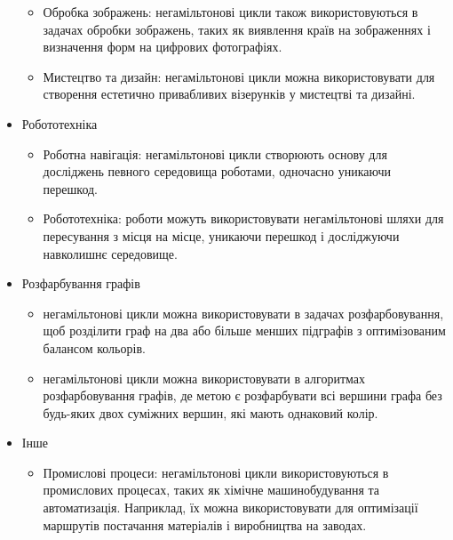 \documentclass[14pt]{article}
\begin{document}
\begin{spacing}{1.175}
\begin{itemize}
\begin{itemize}
            \item Обробка зображень: негамільтонові цикли також використовуються в задачах обробки зображень, таких як виявлення країв на зображеннях і визначення форм на цифрових фотографіях.

            \item Мистецтво та дизайн: негамільтонові цикли можна використовувати для створення естетично привабливих візерунків у мистецтві та дизайні.
        
        \end{itemize}
        
        \item Робототехніка
        
        \begin{itemize}
            \item Роботна навігація: негамільтонові цикли створюють основу для досліджень певного середовища роботами, одночасно уникаючи перешкод.

            \item Робототехніка: роботи можуть використовувати негамільтонові шляхи для пересування з місця на місце, уникаючи перешкод і досліджуючи навколишнє середовище.
        
        \end{itemize}


        \item Розфарбування графів
        \begin{itemize}
            
            \item негамільтонові цикли можна використовувати в задачах розфарбовування, щоб розділити граф на два або більше менших підграфів з оптимізованим балансом кольорів.
            
            \item негамільтонові цикли можна використовувати в алгоритмах розфарбовування графів, де метою є розфарбувати всі вершини графа без будь-яких двох суміжних вершин, які мають однаковий колір.
        
        \end{itemize}


        \item Інше
        \begin{itemize}
            
            \item Промислові процеси: негамільтонові цикли використовуються в промислових процесах, таких як хімічне машинобудування та автоматизація. Наприклад, їх можна використовувати для оптимізації маршрутів постачання матеріалів і виробництва на заводах.


\end{itemize}
\end{itemize}
\end{spacing}
\end{document}
